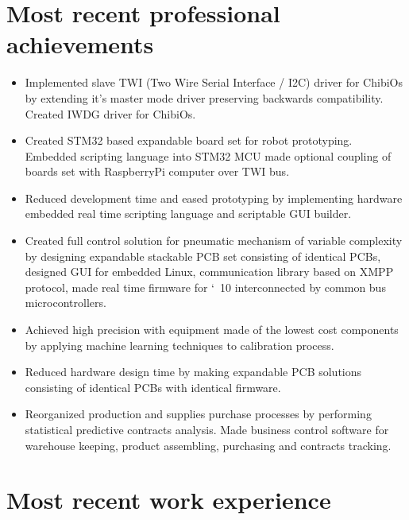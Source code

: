 \documentclass[10pt,letterpaper,oneside,sans]{moderncv}
\begin{document}
\section{Most recent professional achievements}
\begin{itemize}

\item Implemented slave TWI (Two Wire Serial Interface / I2C) driver for ChibiOs by extending it's master mode driver preserving backwards compatibility. Created IWDG driver for ChibiOs.

\item Created STM32 based expandable board set for robot prototyping. Embedded scripting language into STM32 MCU made optional coupling of boards set with RaspberryPi computer over TWI bus.


\item Reduced development time and eased prototyping by implementing hardware embedded real time scripting language and scriptable GUI builder.

\item Created full control solution for pneumatic mechanism of variable complexity by designing expandable stackable PCB set consisting of identical PCBs, designed GUI for embedded Linux, communication library based on XMPP protocol, made real time firmware for \char`~10 interconnected by common bus microcontrollers.

\item Achieved high precision with equipment made of the lowest cost components by applying machine learning techniques to calibration process.

\item Reduced hardware design time by making expandable PCB solutions consisting of identical PCBs with identical firmware.

\item Reorganized production and supplies purchase processes by performing statistical predictive contracts analysis. Made business control software for warehouse keeping, product assembling, purchasing and contracts tracking.

\end{itemize}



\vspace*{-4mm}
\section{Most recent work experience}
\end{document}
